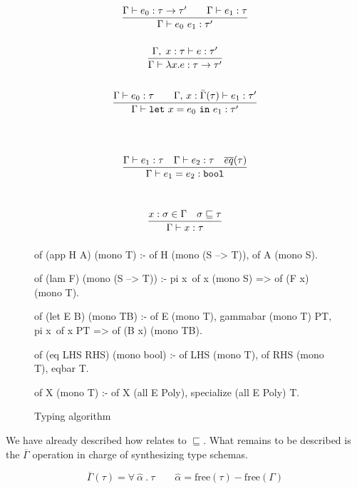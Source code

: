 \documentclass[a4paper, 11pt]{book}
\begin{document}
\begin{figure}[!h]
\begin{minipage}{0.5\textwidth}
$$
\begin{array}{c}
\displaystyle\frac{\Gamma \vdash e_0:\tau \rightarrow \tau' \quad\quad \Gamma \vdash e_1 : \tau }{\Gamma \vdash e_0\ e_1 : \tau'}
\vspace{1.8em}
\\
\displaystyle\frac{\Gamma,\;x:\tau\vdash e:\tau'}{\Gamma \vdash \lambda x.e : \tau \rightarrow \tau'}
\vspace{2.2em}
\\
\displaystyle\frac{\Gamma \vdash e_0:\tau \quad\quad \Gamma,\,x:\bar{\Gamma}(\tau) \vdash e_1:\tau'}{\Gamma \vdash \mathtt{let}\ x = e_0\ \mathtt{in}\ e_1 :  \tau'}
\vspace{4.2em}
\\
\displaystyle\frac{\Gamma \vdash e_1 : \tau \quad \Gamma \vdash e_2 : \tau \quad \overline{eq}(\tau)}{\Gamma \vdash e_1 = e_2: \mathtt{bool}}
\vspace{3.2em}
\\
\displaystyle\frac{x:\sigma \in \Gamma \quad \sigma \sqsubseteq \tau}{\Gamma \vdash x:\tau}
\vspace{0.6em}
\end{array}
$$
\end{minipage}
\begin{minipage}{0.45\textwidth}

\begin{elpicode}
of (app H A) (mono T) :-
  of H (mono (S --> T)),
  of A (mono S).

of (lam F) (mono (S --> T)) :-
  pi x\ of x (mono S) =>
    of (F x) (mono T).

of (let E B) (mono TB) :-
  of E (mono T),
  gammabar (mono T) PT,
  pi x\ of x PT =>
    of (B x) (mono TB).

of (eq LHS RHS) (mono bool) :-
  of LHS (mono T),
  of RHS (mono T),
  eqbar T.

of X (mono T) :-
  of X (all E Poly),
  specialize (all E Poly) T.
\end{elpicode}
\end{minipage}
\caption{Typing algorithm\label{fig:hm}}
\end{figure}

We have already described how  relates to $\sqsubseteq$.
What remains to be described is the $\overline{\Gamma}$ operation
in charge of synthesizing type schemas.

$$
\overline{\Gamma}(\tau) = \forall\ \hat{\alpha}\ .\ \tau \quad\quad \hat{\alpha} = \textrm{free}(\tau) - \textrm{free}(\Gamma)
$$
\end{document}
